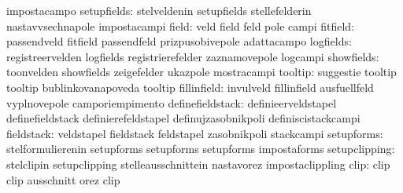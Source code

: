                                  impostacampo
                     setupfields: stelveldenin                     setupfields
                                  stellefelderin                   nastavvsechnapole
                                  impostacampi
                           field: veld                             field
                                  feld                             pole
                                  campi
                        fitfield: passendveld                      fitfield
                                  passendfeld                      prizpusobivepole %
                                  adattacampo
                       logfields: registreervelden                 logfields
                                  registrierefelder                zaznamovepole
                                  logcampi                         %
                      showfields: toonvelden                       showfields
                                  zeigefelder                      ukazpole
                                  mostracampi
                         tooltip: suggestie                        tooltip
                                  tooltip                          bublinkovanapoveda
                                  tooltip                          %
                     fillinfield: invulveld                        fillinfield
                                  ausfuellfeld                     vyplnovepole
                                  camporiempimento
                definefieldstack: definieerveldstapel              definefieldstack
                                  definierefeldstapel              definujzasobnikpoli
                                  definiscistackcampi              %
                      fieldstack: veldstapel                       fieldstack
                                  feldstapel                       zasobnikpoli
                                  stackcampi
                      setupforms: stelformulierenin                setupforms
                                  setupforms                       setupforms
                                  impostaforms                     %
                   setupclipping: stelclipin                       setupclipping
                                  stelleausschnittein              nastavorez
                                  impostaclippling                 %
                            clip: clip                             clip
                                  ausschnitt                       orez
                                  clip
